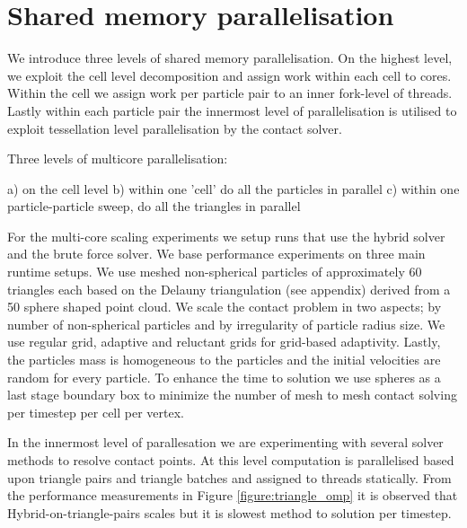\section{Shared memory parallelisation}
\label{section:shared-memory}

We introduce three levels of shared memory parallelisation. On the highest level, we exploit the cell level decomposition and assign work within each cell to cores. Within the cell we assign work per particle pair  to an inner fork-level of threads. Lastly within each particle pair the innermost level of parallelisation is utilised to exploit tessellation level parallelisation by the contact solver.

Three levels of multicore parallelisation:

a) on the cell level
b) within one 'cell' do all the particles in parallel
c) within one particle-particle sweep, do all the triangles in parallel

For the multi-core scaling experiments we setup runs that use the hybrid solver and the brute force solver. We base performance experiments on three main runtime setups. We use meshed non-spherical particles of approximately 60 triangles each based on the Delauny triangulation (see appendix) derived from a 50 sphere shaped point cloud. We scale the contact problem in two aspects; by number of non-spherical particles and by irregularity of particle radius size. We use regular grid, adaptive and reluctant grids for grid-based adaptivity. Lastly, the particles mass is homogeneous to the particles and the initial velocities are random for every particle. To enhance the time to solution we use spheres as a last stage boundary box to minimize the number of mesh to mesh contact solving per timestep per cell per vertex.

\clearpage

In the innermost level of parallesation we are experimenting with several solver methods to resolve contact points. At this level computation is parallelised based upon triangle pairs and triangle batches and assigned to threads statically. 
From the performance measurements in Figure \ref{figure:triangle_omp} it is observed that Hybrid-on-triangle-pairs scales but it is slowest method to solution per timestep. 

